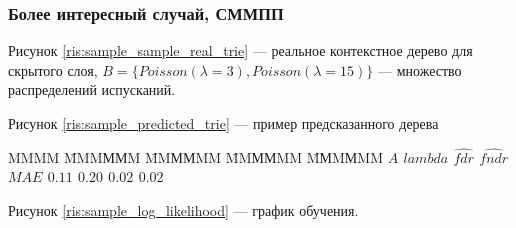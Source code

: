 \documentclass{matmex-diploma-custom}
\begin{document}
\subsubsection{Более интересный случай, СММПП}
Рисунок \ref{ris:sample_sample_real_trie} --- реальное контекстное дерево для скрытого слоя, 
$B = \{\textit{Poisson}(\lambda=3), \textit{Poisson}(\lambda=15)\}$ --- 
множество распределений испусканий.

Рисунок \ref{ris:sample_predicted_trie} --- пример предсказанного дерева
\begin{tabbing}
MMMM \= MMMММM \= MMММMM \= MMММMM \= MМMМMM \kill
\bf{}  \> {\bf $\textit{A}$} \> {\bf $\textit{lambda}$} \> {\bf $\hat{\textit{fdr}}$} \> {\bf $\hat{\textit{fndr}}$}\\ 
$\textit{MAE}$ \> $0.11$ \> $0.20$ \> $0.02$ \> $0.02$ \
\end{tabbing}
Рисунок \ref{ris:sample_log_likelihood} --- график обучения.
\end{document}
